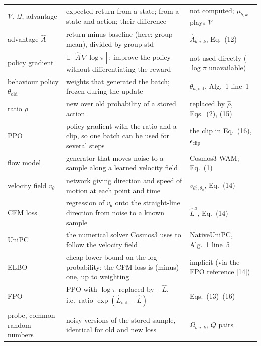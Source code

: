 \documentclass[11pt,a4paper]{article}
\newcommand{\E}{\mathbb{E}}
\newcommand{\Ah}{\hat A}
\newcommand{\Lh}{\hat L}
\newcommand{\Vf}{\mathcal{V}}
\newcommand{\Qf}{\mathcal{Q}}
\begin{document}
\begin{center}
\begin{tabularx}{\linewidth}{@{}l Y >{\raggedright\arraybackslash}p{4.2cm}@{}}
$\Vf$, $\Qf$, advantage & expected return from a state; from a state and action; their difference & not computed; $\mu_{b,k}$ plays $\Vf$\\
advantage $\Ah$ & return minus baseline (here: group mean), divided by group std & $\hat A_{b,i,k}$, Eq.~(12)\\
policy gradient & $\E[\Ah\,\nabla\log\pi]$: improve the policy without differentiating the reward & not used directly ($\log\pi$ unavailable)\\
behaviour policy $\theta_{\mathrm{old}}$ & weights that generated the batch; frozen during the update & $\theta_{a,\mathrm{old}}$, Alg.~1 line~1\\
ratio $\rho$ & new over old probability of a stored action & replaced by $\hat\rho$, Eqs.~(2), (15)\\
PPO & policy gradient with the ratio and a clip, so one batch can be used for several steps & the clip in Eq.~(16), $\epsilon_{\mathrm{clip}}$\\
flow model & generator that moves noise to a sample along a learned velocity field & Cosmos3 WAM; Eq.~(1)\\
velocity field $v_\theta$ & network giving direction and speed of motion at each point and time & $v_{\theta_v^0,\theta_a}$, Eq.~(14)\\
CFM loss & regression of $v_\theta$ onto the straight-line direction from noise to a known sample & $\hat L^a$, Eq.~(14)\\
UniPC & the numerical solver Cosmos3 uses to follow the velocity field & NativeUniPC, Alg.~1 line~5\\
ELBO & cheap lower bound on the log-probability; the CFM loss is (minus) one, up to weighting & implicit (via the FPO reference [14])\\
FPO & PPO with $\log\pi$ replaced by $-\Lh$, i.e.\ ratio $\exp(\Lh_{\mathrm{old}}-\Lh)$ & Eqs.~(13)--(16)\\
probe, common random numbers & noisy versions of the stored sample, identical for old and new loss & $\Omega_{b,i,k}$, $Q$ pairs\\
\bottomrule
\end{tabularx}
\end{center}
\end{document}
